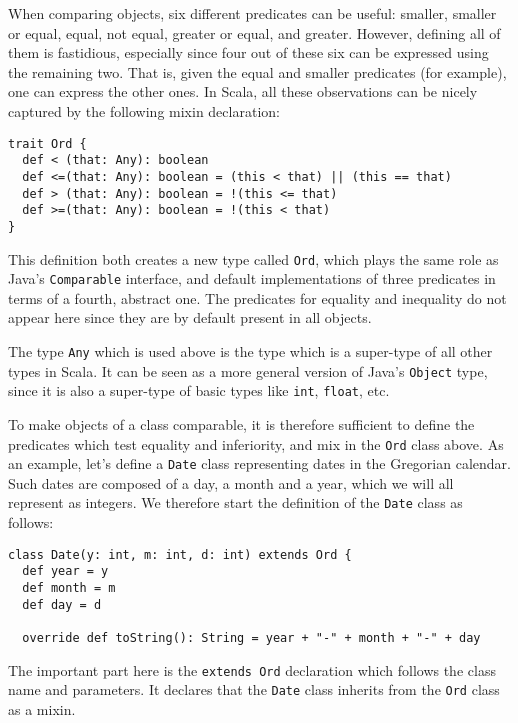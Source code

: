 \documentclass[a4paper,11pt,twoside,titlepage]{article}
\begin{document}
When comparing objects, six different predicates can be useful:
smaller, smaller or equal, equal, not equal, greater or equal, and
greater. However, defining all of them is fastidious, especially since
four out of these six can be expressed using the remaining two. That
is, given the equal and smaller predicates (for example), one can
express the other ones. In Scala, all these observations can be
nicely captured by the following mixin declaration:
\begin{lstlisting}
trait Ord {
  def < (that: Any): boolean
  def <=(that: Any): boolean = (this < that) || (this == that)
  def > (that: Any): boolean = !(this <= that)
  def >=(that: Any): boolean = !(this < that)
} 
\end{lstlisting}
This definition both creates a new type called \lstinline?Ord?, which
plays the same role as Java's \lstinline?Comparable? interface, and
default implementations of three predicates in terms of a fourth,
abstract one. The predicates for equality and inequality do not appear
here since they are by default present in all objects.

The type \lstinline?Any? which is used above is the type which is a
super-type of all other types in Scala. It can be seen as a more
general version of Java's \lstinline?Object? type, since it is also a
super-type of basic types like \lstinline?int?, \lstinline?float?, etc.

To make objects of a class comparable, it is therefore sufficient to
define the predicates which test equality and inferiority, and mix in
the \lstinline?Ord? class above. As an example, let's define a
\lstinline?Date? class representing dates in the Gregorian calendar. Such
dates are composed of a day, a month and a year, which we will all
represent as integers. We therefore start the definition of the
\lstinline?Date? class as follows:
\begin{lstlisting}
class Date(y: int, m: int, d: int) extends Ord {
  def year = y
  def month = m
  def day = d

  override def toString(): String = year + "-" + month + "-" + day
\end{lstlisting}
The important part here is the \lstinline?extends Ord? declaration which
follows the class name and parameters. It declares that the
\lstinline?Date? class inherits from the \lstinline?Ord? class as a mixin.
\end{document}
